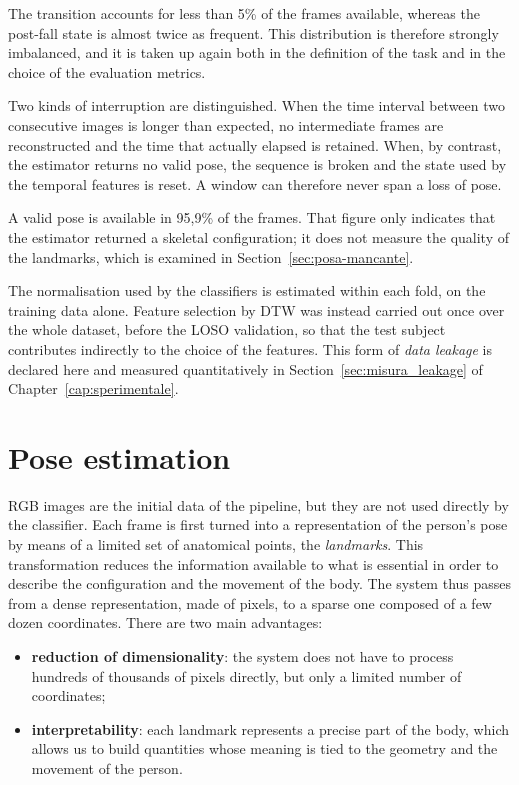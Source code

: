 The transition accounts for less than 5\% of the frames available, whereas the post-fall state is almost twice as frequent. This distribution is therefore strongly imbalanced, and it is taken up again both in the definition of the task and in the choice of the evaluation metrics.

Two kinds of interruption are distinguished. When the time interval between two consecutive images is longer than expected, no intermediate frames are reconstructed and the time that actually elapsed is retained. When, by contrast, the estimator returns no valid pose, the sequence is broken and the state used by the temporal features is reset. A window can therefore never span a loss of pose.

A valid pose is available in 95,9\% of the frames. That figure only indicates that the estimator returned a skeletal configuration; it does not measure the quality of the landmarks, which is examined in Section~\ref{sec:posa-mancante}.

The normalisation used by the classifiers is estimated within each fold, on the training data alone. Feature selection by DTW was instead carried out once over the whole dataset, before the LOSO validation, so that the test subject contributes indirectly to the choice of the features. This form of \emph{data leakage} is declared here and measured quantitatively in Section~\ref{sec:misura_leakage} of Chapter~\ref{cap:sperimentale}.

\section{Pose estimation}
\label{sec:pose}

RGB images are the initial data of the pipeline, but they are not used directly by the classifier. Each frame is first turned into a representation of the person's pose by means of a limited set of anatomical points, the \emph{landmarks}.
This transformation reduces the information available to what is essential in order to describe the configuration and the movement of the body. The system thus passes from a dense representation, made of pixels, to a sparse one composed of a few dozen coordinates.
There are two main advantages:
\begin{itemize}
    \item \textbf{reduction of dimensionality}: the system does not have to process hundreds of thousands of pixels directly, but only a limited number of coordinates;
    \item \textbf{interpretability}: each landmark represents a precise part of the body, which allows us to build quantities whose meaning is tied to the geometry and the movement of the person.
\end{itemize}

